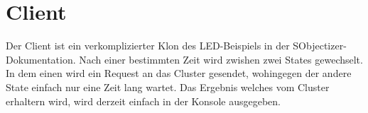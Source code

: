 \section{Client}
Der Client ist ein verkomplizierter Klon des LED-Beispiels in der SObjectizer-Dokumentation.  Nach einer bestimmten Zeit wird zwishen zwei
States gewechselt. In dem einen wird ein Request an das Cluster gesendet, wohingegen der andere State einfach nur eine Zeit lang wartet.
Das Ergebnis welches vom Cluster erhaltern wird, wird derzeit einfach in der Konsole ausgegeben.
